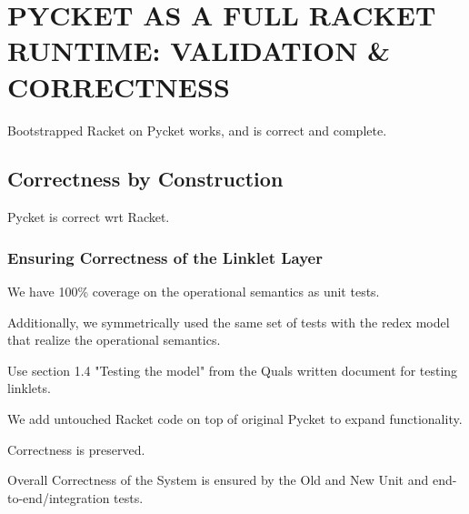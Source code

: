 \chapter[\texorpdfstring{PYCKET AS A FULL RACKET RUNTIME: VALIDATION \& CORRECTNESS}
                          {Validation \& Correctness}]{PYCKET AS A FULL RACKET RUNTIME: VALIDATION \& CORRECTNESS}

	\label{chapter:validation}

	\begin{chaptersynopsis}
		Bootstrapped Racket on Pycket works, and is correct and complete.
	\end{chaptersynopsis}


	\section{Correctness by Construction}

		\begin{mainpoint}
			Pycket is correct wrt Racket.
		\end{mainpoint}

		\subsection{Ensuring Correctness of the Linklet Layer}
			\begin{mainpoint}
				We have 100\% coverage on the operational semantics as unit tests.

				Additionally, we symmetrically used the same set of tests with the redex model that realize the operational semantics.
			\end{mainpoint}

			\begin{todo}[Import]
				Use section 1.4 "Testing the model" from the Quals written document for testing linklets.
			\end{todo}

		\begin{paragraph-here}
			We add untouched Racket code on top of original Pycket to expand functionality.

				Correctness is preserved.
		\end{paragraph-here}

		\begin{paragraph-here}
			Overall Correctness of the System is ensured by the Old and New Unit and end-to-end/integration tests.
		\end{paragraph-here}

